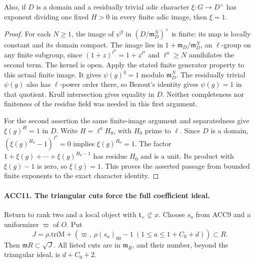 Also, if \(D\) is a domain and a residually trivial adic character
\(\xi:G\to D^\times\) has exponent dividing one fixed \(H>0\)
in every finite adic image, then \(\xi=1\).

\begin{proof}
For each \(N\ge1\), the image of \(\psi^q\) in
\((D/\mathfrak m_D^N)^\times\) is finite: its map is locally
constant and its domain compact.  The image lies in \(1+
\mathfrak m_D/\mathfrak m_D^N\), an \(\ell\)-group on any
finite subgroup, since
\((1+z)^{\ell^a}=1+z^{\ell^a}\) and \(\ell^a\ge N\)
annihilates the second term.  The kernel is open.  Apply the
stated finite generator property to this actual finite image.
It gives \(\psi(g)^q=1\) modulo \(\mathfrak m_D^N\).
The residually trivial \(\psi(g)\) also has \(\ell\)-power
order there, so Bezout's identity gives \(\psi(g)=1\) in that
quotient.  Krull intersection gives equality in \(D\).
Neither completeness nor finiteness of the residue field was
needed in this first argument.

For the second assertion the same finite-image argument and
separatedness give \(\xi(g)^H=1\) in \(D\).  Write
\(H=\ell^a H_0\), with \(H_0\) prime to \(\ell\).
Since \(D\) is a domain,
\((\xi(g)^{H_0}-1)^{\ell^a}=0\) implies
\(\xi(g)^{H_0}=1\).  The factor
\(1+\xi(g)+\cdots+\xi(g)^{H_0-1}\) has residue \(H_0\)
and is a unit.  Its product with \(\xi(g)-1\) is zero, so
\(\xi(g)=1\).  This proves the asserted passage from bounded
finite exponents to the exact character identity.
\end{proof}

\paragraph{ACC11. The triangular cuts force the full coefficient ideal.}
\label{claim:ACC11}
Return to rank two and a local object with
\(\mathfrak t_+\not\subset x\).  Choose \(s_a\) from ACC9
and a uniformizer \(\varpi\) of \(O\).  Put
\[
 J=\rho.\mathrm{triM}+
       (\varpi,\ \rho(s_a)_{00}-1\ (1\le a\le1+C_0+d))
                          \subset R.                     \tag{ACC.19}
\]
Then \(\mathfrak mR\subset\sqrt J\).  All listed cuts are
in \(\mathfrak m_R\), and their number, beyond the triangular
ideal, is \(d+C_0+2\).


